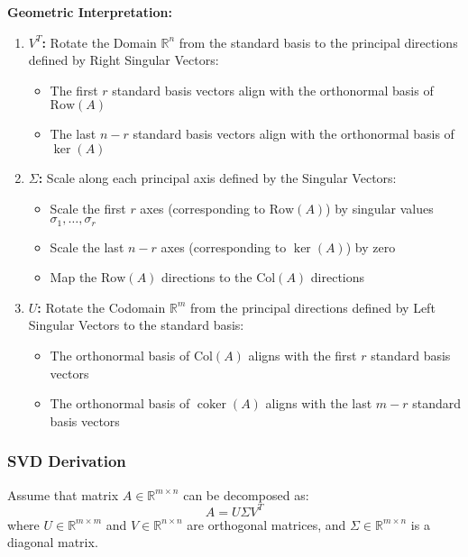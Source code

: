 \documentclass{article}
\begin{document}
\textbf{Geometric Interpretation:}
\begin{enumerate}
    \item \textbf{$V^T$:} Rotate the Domain $\mathbb{R}^n$ from the standard basis to the principal directions defined by Right Singular Vectors:
    \begin{itemize}
        \item The first $r$ standard basis vectors align with the orthonormal basis of $\text{Row}(A)$
        \item The last $n-r$ standard basis vectors align with the orthonormal basis of $\ker(A)$
    \end{itemize}

    \item \textbf{$\Sigma$:} Scale along each principal axis defined by the Singular Vectors:
    \begin{itemize}
        \item Scale the first $r$ axes (corresponding to $\text{Row}(A)$) by singular values $\sigma_1, \ldots, \sigma_r$
        \item Scale the last $n-r$ axes (corresponding to $\ker(A)$) by zero
        \item Map the $\text{Row}(A)$ directions to the $\text{Col}(A)$ directions
    \end{itemize}

    \item \textbf{$U$:} Rotate the Codomain $\mathbb{R}^m$ from the principal directions defined by Left Singular Vectors to the standard basis:
    \begin{itemize}
        \item The orthonormal basis of $\text{Col}(A)$ aligns with the first $r$ standard basis vectors
        \item The orthonormal basis of $\operatorname{coker}(A)$ aligns with the last $m-r$ standard basis vectors
    \end{itemize}
\end{enumerate}

\subsubsection{SVD Derivation}
Assume that matrix $A \in \mathbb{R}^{m \times n}$ can be decomposed as:
\[
    A = U \Sigma V^T
\]
where $U \in \mathbb{R}^{m \times m}$ and $V \in \mathbb{R}^{n \times n}$ are orthogonal matrices, and $\Sigma \in \mathbb{R}^{m \times n}$ is a diagonal matrix.
\end{document}
